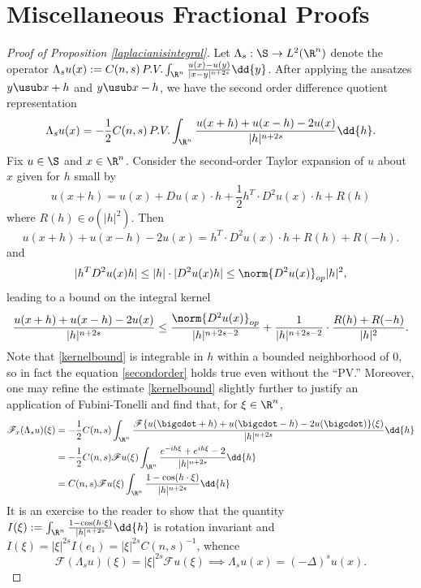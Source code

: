 \documentclass[../main.tex]{subfiles}
\begin{document}
\section{Miscellaneous Fractional Proofs}\label{appendix:misc}


\begin{proof}[Proof of Proposition \ref{laplacianisintegral}]
    Let $ \Lambda_{s}:\S\to L^{2}(\R^{n}) $ denote the operator $ \Lambda_{s}u(x) := C(n,s)\, P.V. \int_{\R^{n}}\frac{u(x)-u(y)}{|x-y|^{n+2s}}\dd{y} $. After applying the ansatzes $ y \usub x+h$ and $ y\usub x-h $, we have the second order difference quotient representation
    \begin{equation}\label{secondorder}
        \Lambda_{s}u(x) = -\frac{1}{2}C(n,s)\, P.V.\int_{\R^{n}} \frac{u(x+h) + u(x-h) -2u(x)}{|h|^{n+2s}} \dd{h}.
    \end{equation}
    Fix $ u\in \S $ and $ x\in \R^{n} $. Consider the second-order Taylor expansion of $ u $ about $ x $ given for $ h $ small by 
    \begin{equation}
        u(x+h) = u(x) + Du(x)\cdot h + \frac{1}{2}h^{T}\cdot D^{2}u(x)\cdot h + R(h)
    \end{equation}
    where $ R(h) \in o(|h|^{2}) $. Then 
    \[
        u(x+h)+u(x-h)-2u(x) = h^{T}\cdot D^{2}u(x)\cdot h + R(h) + R(-h).
    \]
    and 
    \[
        |h^{T}D^{2}u(x)h| \leq |h|\cdot |D^{2}u(x)h| \leq \norm{D^{2}u(x)}_{op}|h|^{2},
    \]
    leading to a bound on the integral kernel
    \begin{equation}\label{kernelbound}
        \frac{u(x+h)+u(x-h)-2u(x)}{|h|^{n+2s}} \leq \frac{\norm{D^{2}u(x)}_{op}}{|h|^{n+2s-2}} + \frac{1}{|h|^{n+2s-2}}\cdot\frac{R(h)+R(-h)}{|h|^{2}}.
    \end{equation}
    Note that \ref{kernelbound} is integrable in $ h $ within a bounded neighborhood of $ 0 $, so in fact the equation \ref{secondorder} holds true even without the ``PV.'' Moreover, one may refine the estimate \ref{kernelbound} slightly further to justify an application of Fubini-Tonelli and find that, for $ \xi\in \R^{n} $,
    \begin{align*}
        \mathscr{F}_{x} (\Lambda_{s}u)(\xi) &= -\frac{1}{2}C(n,s) \int_{\R^{n}} \frac{\mathscr{F}\{u(\bigcdot+h)+u(\bigcdot-h)-2u(\bigcdot)\}(\xi)}{|h|^{n+2s}} \dd{h} \\
        &= -\frac{1}{2}C(n,s) \mathscr{F}u(\xi)\int_{\R^{n}} \frac{e^{-ih \xi}+e^{ih \xi}-2}{|h|^{n+2s}}\dd{h} \\
        &= C(n,s) \mathscr{F}u(\xi)\int_{\R^{n}} \frac{1-\cos(h\cdot \xi)}{|h|^{n+2s}}\dd{h} \\
    \end{align*}
    It is an exercise to the reader to show that the quantity $ I(\xi):= \int_{\R^{n}} \frac{1-\cos(h\cdot \xi)}{|h|^{n+2s}}\dd{h} $ is rotation invariant and $ I(\xi) = | \xi|^{2s}I(e_{1}) =| \xi|^{2s} C(n,s)^{-1} $, whence
    \[
        \mathscr{F}(\Lambda_{s}u)(\xi) = | \xi|^{2s}\mathscr{F}u(\xi) \implies \Lambda_{s}u(x) = (-\Delta )^{s}u(x).
    \]
\end{proof}
\end{document}
